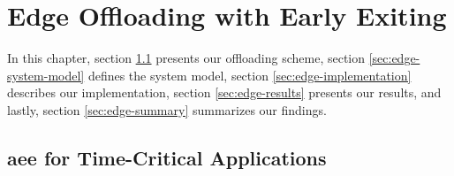 \hypertarget{earlyexiting}{%
	\chapter{Edge Offloading with Early Exiting}\label{ch:edgeoffloading}}
\thispagestyle{fancy}

In this chapter, section \ref{sec:edge-aee} presents our offloading scheme, section \ref{sec:edge-system-model} defines the system model, section \ref{sec:edge-implementation} describes our implementation, section \ref{sec:edge-results} presents our results, and lastly, section \ref{sec:edge-summary} summarizes our findings.

\section{\acrfull{aee} for Time-Critical Applications} \label{sec:edge-aee}

